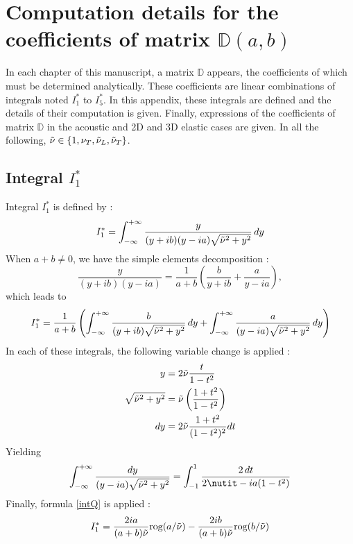 \chapter{Computation details for the coefficients of matrix $\mathbb{D}(a,b)$}
\label{matD}
In each chapter of this manuscript, a matrix $\mathbb{D}$ appears, the coefficients of which must be determined analytically. These coefficients are linear combinations of integrals noted $I_1^*$ to $I_5^*$. In this appendix, these integrals are defined and the details of their computation is given. Finally, expressions of the coefficients of matrix $\mathbb{D}$ in the acoustic and 2D and 3D elastic cases are given. In all the following, $\tilde{\nu} \in \{ 1,\nu_T,\tilde{\nu}_L,\tilde{\nu}_T \}$.

\section{Integral $I_1^*$}
\label{calcI1}
Integral $I_1^*$ is defined by :
\begin{equation}
\label{defI1}
I_1^*=\int_{-\infty}^{+\infty} \frac{y}{(y+ib)(y-ia)\sqrt{\tilde{\nu}^2+y^2}}\,dy
\end{equation}
When $a+b \neq 0$, we have the simple elements decomposition :
\begin{equation}
\frac{y}{(y+ib)(y-ia)}=\frac{1}{a+b} \left( \frac{b}{y+ib}+\frac{a}{y-ia} \right), 
\label{decomp2}
\end{equation}
which leads to
\begin{equation}
I_1^*= \frac{1}{a+b} \left( \int_{-\infty}^{+\infty} \frac{b}{(y+ib)\sqrt{\tilde{\nu}^2+y^2}} \,dy +\int_{-\infty}^{+\infty} \frac{a}{(y-ia)\sqrt{\tilde{\nu}^2+y^2}} \,dy \right)
\end{equation}
In each of these integrals, the following variable change is applied :
\begin{equation}
\begin{split}
 y&=2\tilde{\nu} \frac{t}{1-t^2} \\
\sqrt{\tilde{\nu}^2+y^2}&=\tilde{\nu}\left( \frac{1+t^2}{1-t^2} \right)  \\
 dy&= 2\tilde{\nu} \frac{1+t^2}{(1-t^2)^2}dt 
\end{split}
\label{changevar}
\end{equation}
Yielding
\begin{equation}
\int_{-\infty}^{+\infty} \frac{dy}{(y-ia)\sqrt{\nuti^2+y^2}}=\int_{-1}^1\frac{2\,dt}{2\nutit-ia(1-t^2)}
\end{equation}
Finally, formula \eqref{intQ} is applied :
\begin{equation}
I_1^*=\frac{2ia}{(a+b)\tilde{\nu}}\mbox{rog}(a/\tilde{\nu})-\frac{2ib}{(a+b)\tilde{\nu}}\mbox{rog}(b/\tilde{\nu})
\label{valI1}
\end{equation}

